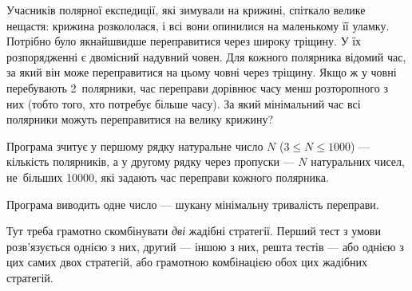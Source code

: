 ﻿
Учасників полярної експедиції, які зимували на крижині, спіткало велике нещастя: крижина розкололася, і всі вони опинилися на маленькому її уламку. Потрібно було якнайшвидше переправитися через широку тріщину. У їх розпорядженні є двомісний надувний човен. Для кожного полярника відомий час, за який він може переправитися на цьому човні через тріщину. Якщо ж у човні перебувають 2~полярники, час переправи дорівнює часу менш
розторопного з них (тобто того, хто потребує більше часу). За який мінімальний час всі полярники можуть переправитися на велику крижину?

\InputFile
Програма зчитує у першому рядку натуральне число $N$ ($3\leqslant N\leqslant 1000$) --- кількість полярників, а у другому рядку через пропуски --- $N$ натуральних чисел, не~більших 10000, які задають час переправи кожного полярника.

\OutputFile
Програма виводить одне число --- шукану мінімальну тривалість переправи.

\Examples
\begin{example}
\end{example}

\Note
Тут треба грамотно скомбінувати {\it дві} жадібні стратегії. Перший тест з умови розв'язується однією з них, др{\it у}гий --- іншою з них, решта тестів --- або однією з цих самих двох стратегій, або грамотною комбінацією обох цих жадібних стратегій.
